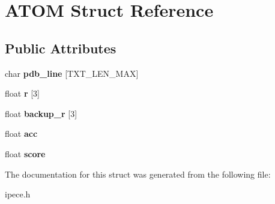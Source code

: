 \hypertarget{struct_a_t_o_m}{\section{A\-T\-O\-M Struct Reference}
\label{struct_a_t_o_m}
}
\subsection*{Public Attributes}
\begin{DoxyCompactItemize}
\item 
\hypertarget{struct_a_t_o_m_af65d9f0507f86c5dfcccfb91a80f9282}{char {\bfseries pdb\-\_\-line} \mbox{[}T\-X\-T\-\_\-\-L\-E\-N\-\_\-\-M\-A\-X\mbox{]}}\label{struct_a_t_o_m_af65d9f0507f86c5dfcccfb91a80f9282}

\item 
\hypertarget{struct_a_t_o_m_a61b57cd5414aa93d8720a250425db1ed}{float {\bfseries r} \mbox{[}3\mbox{]}}\label{struct_a_t_o_m_a61b57cd5414aa93d8720a250425db1ed}

\item 
\hypertarget{struct_a_t_o_m_a69892d79e53d414a5c22c4639ce2cbe2}{float {\bfseries backup\-\_\-r} \mbox{[}3\mbox{]}}\label{struct_a_t_o_m_a69892d79e53d414a5c22c4639ce2cbe2}

\item 
\hypertarget{struct_a_t_o_m_aa07a746e7daa40cd4e53d0b04e7f794e}{float {\bfseries acc}}\label{struct_a_t_o_m_aa07a746e7daa40cd4e53d0b04e7f794e}

\item 
\hypertarget{struct_a_t_o_m_a72445ca4aac4ef6c095bbc73dc25b313}{float {\bfseries score}}\label{struct_a_t_o_m_a72445ca4aac4ef6c095bbc73dc25b313}

\end{DoxyCompactItemize}


The documentation for this struct was generated from the following file\-:\begin{DoxyCompactItemize}
\item 
ipece.\-h\end{DoxyCompactItemize}
